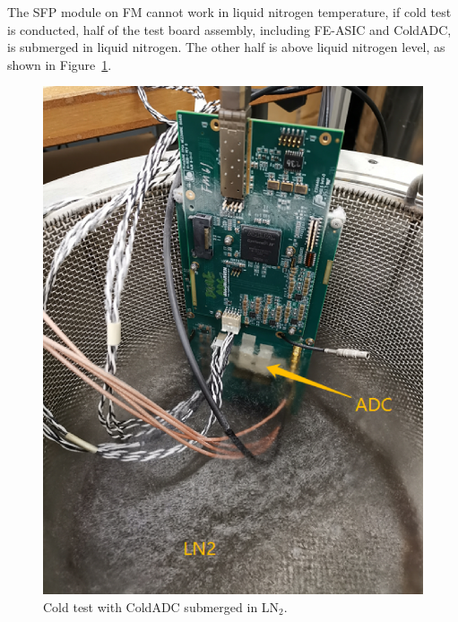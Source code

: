 The SFP module on FM cannot work in liquid nitrogen temperature, if cold test is conducted, half of the test board assembly, including FE-ASIC and ColdADC, is submerged in liquid nitrogen. The other half is above liquid nitrogen level, as shown in Figure~\ref{fig:bnl_coldtest}.    
\begin{figure}[!ht]
\centering
 \includegraphics[width=0.5\linewidth]{figures/BNL_coldtest.png}
  \caption{Cold test with ColdADC submerged in LN$_2$.}
  \label{fig:bnl_coldtest}
\end{figure}
